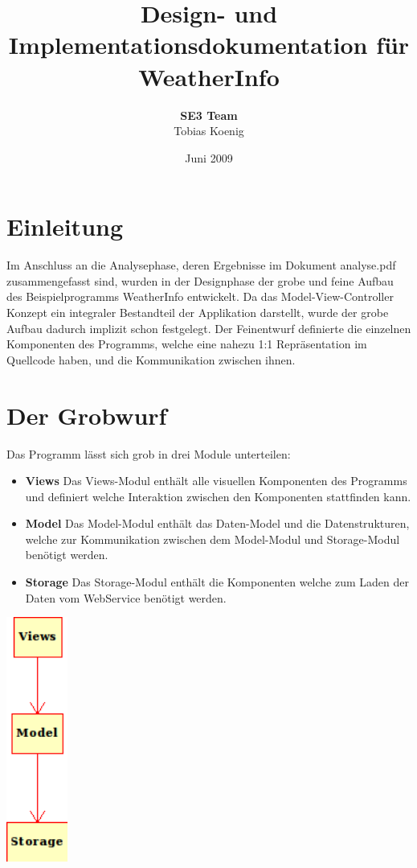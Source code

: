 \documentclass[11pt,a4paper]{scrreprt}
\begin{document}
\selectlanguage{\german}
\title{\LARGE Design- und Implementationsdokumentation für WeatherInfo}
\author{{\bf SE3 Team}\\Tobias Koenig}
\date{Juni 2009}

\maketitle

\tableofcontents

\chapter{Einleitung}
Im Anschluss an die Analysephase, deren Ergebnisse im Dokument analyse.pdf
zusammengefasst sind, wurden in der Designphase der grobe und feine
Aufbau des Beispielprogramms WeatherInfo entwickelt. Da das Model-View-Controller
Konzept ein integraler Bestandteil der Applikation darstellt, wurde der
grobe Aufbau dadurch implizit schon festgelegt. Der Feinentwurf definierte
die einzelnen Komponenten des Programms, welche eine nahezu 1:1 Repr\"asentation
im Quellcode haben, und die Kommunikation zwischen ihnen.

\chapter{Der Grobwurf}
Das Programm l\"asst sich grob in drei Module unterteilen:
\begin{itemize}
  \item \textbf{Views} Das Views-Modul enth\"alt alle visuellen Komponenten des Programms
                       und definiert welche Interaktion zwischen den Komponenten stattfinden kann.
  \item \textbf{Model} Das Model-Modul enth\"alt das Daten-Model und die Datenstrukturen, welche
                       zur Kommunikation zwischen dem Model-Modul und Storage-Modul ben\"otigt werden.
  \item \textbf{Storage} Das Storage-Modul enth\"alt die Komponenten welche zum Laden der Daten vom
                         WebService ben\"otigt werden.
\end{itemize}

\begin{center}
  \includegraphics[width=2cm]{grobentwurf.png}
\end{center}
\end{document}
